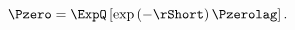 \begin{equation} \label{eq:nPzeroQ}
	\Pzero = \ExpQ \left[ \exp\left(- \rShort\right) \Pzerolag \right].
\end{equation}